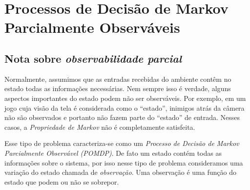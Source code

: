 \documentclass{article}
\begin{document}
        \begin{center}
        \end{center}
        
    \section{Processos de Decisão de Markov Parcialmente Observáveis}
    
        \subsection{Nota sobre \emph{observabilidade parcial}}

            Normalmente, assumimos que as entradas recebidas do ambiente contêm no estado todas as informações necessárias. Nem sempre isso é verdade, alguns aspectos importantes do estado podem não ser observáveis. Por exemplo, em um jogo cuja visão da tela é considerada como o ``estado'', inimigos atrás da câmera não são observados e portanto não fazem parte do ``estado'' de entrada. Nesses casos, a \emph{Propriedade de Markov} não é completamente satisfeita. 
            
            Esse tipo de problema caracteriza-se como um \emph{Processo de Decisão de Markov Parcialmente Observável (POMDP)}. De fato um estado contém todas as informações sobre o sistema, por isso nesse tipo de problema consideramos uma variação do estado chamada de \emph{observação}. Uma observação é uma função do estado que podem ou não se sobrepor.
            
\end{document}
